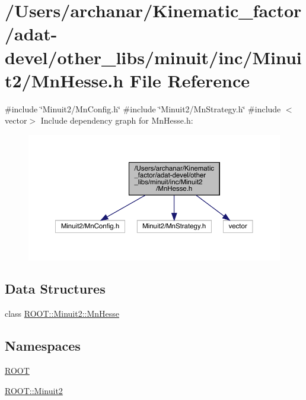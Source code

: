 \hypertarget{adat-devel_2other__libs_2minuit_2inc_2Minuit2_2MnHesse_8h}{}\section{/\+Users/archanar/\+Kinematic\+\_\+factor/adat-\/devel/other\+\_\+libs/minuit/inc/\+Minuit2/\+Mn\+Hesse.h File Reference}
\label{adat-devel_2other__libs_2minuit_2inc_2Minuit2_2MnHesse_8h}
{\ttfamily \#include \char`\"{}Minuit2/\+Mn\+Config.\+h\char`\"{}}\newline
{\ttfamily \#include \char`\"{}Minuit2/\+Mn\+Strategy.\+h\char`\"{}}\newline
{\ttfamily \#include $<$vector$>$}\newline
Include dependency graph for Mn\+Hesse.\+h\+:
\nopagebreak
\begin{figure}[H]
\begin{center}
\leavevmode
\includegraphics[width=350pt]{d4/d32/adat-devel_2other__libs_2minuit_2inc_2Minuit2_2MnHesse_8h__incl}
\end{center}
\end{figure}
\subsection*{Data Structures}
\begin{DoxyCompactItemize}
\item 
class \mbox{\hyperlink{classROOT_1_1Minuit2_1_1MnHesse}{R\+O\+O\+T\+::\+Minuit2\+::\+Mn\+Hesse}}
\end{DoxyCompactItemize}
\subsection*{Namespaces}
\begin{DoxyCompactItemize}
\item 
 \mbox{\hyperlink{namespaceROOT}{R\+O\+OT}}
\item 
 \mbox{\hyperlink{namespaceROOT_1_1Minuit2}{R\+O\+O\+T\+::\+Minuit2}}
\end{DoxyCompactItemize}
